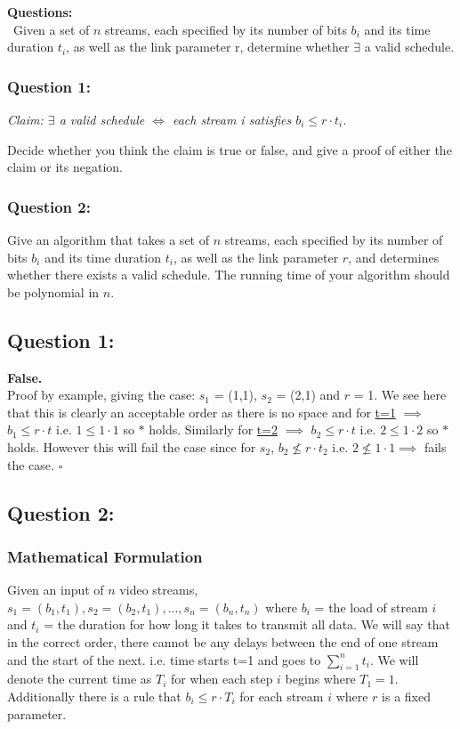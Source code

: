 \documentclass[12pt]{article}
\begin{document}
\textbf{Questions:} \\
~\indent Given a set of $n$ streams, each specified by its number
of bits $b_i$ and its time duration $t_i$, as well as the link
parameter r, determine whether $\exists$ a valid schedule.

\subsubsection{Question 1:}
\begin{center}\textit{Claim: $\exists$ a valid schedule $\iff$
each stream i satisfies $b_i\leq r\cdot t_i$.}\end{center}
Decide whether you think the claim is true or false, and give a
proof of either the claim or its negation.

\subsubsection{Question 2:}
Give an algorithm that takes a set of $n$ streams, each specified
by its number of bits $b_i$ and its time duration $t_i$, as well as
the link parameter $r$, and determines whether there exists a valid
schedule. The running time of your algorithm should be polynomial
in $n$.


\newpage
\subsection{Question 1:}
\textbf{False.} \\
Proof by example, giving the case:  $s_1$ = (1,1), $s_2$ = (2,1)
and $r$ = 1. We see here that this is clearly an acceptable order as
there is no space and for \underline{t=1} $\implies$ $b_1 \leq r\cdot t$
i.e. $1 \leq 1\cdot 1$ so $\ast$ holds. Similarly for \underline{t=2}
$\implies$ $b_2 \leq r\cdot t$ i.e. $2 \leq 1\cdot 2$ so $\ast$ holds.
However this will fail the case since for $s_2$, $b_2 \nleq r\cdot t_2$
i.e. $2 \nleq 1\cdot 1 \implies$ fails the case. $\square$

\subsection{Question 2:}
\subsubsection{Mathematical Formulation}
Given an input of $n$ video streams, $s_1 = (b_1,t_1), s_2 = (b_2, t_1),
..., s_n = (b_n,t_n)$ where $b_i$ = the load of stream $i$ and $t_i$ =
the duration for how long it takes to transmit all data. We will say
that in the correct order, there cannot be any delays between the end
of one stream and the start of the next. i.e. time starts t=1 and goes
to $\sum_{i=1}^{n} t_i$. We will denote the current time as $T_i$
for when each step $i$ begins where $T_1 = 1$. Additionally there is a
rule that $b_i \leq r\cdot T_i$ for each stream $i$ where $r$ is a
fixed parameter.
\end{document}
